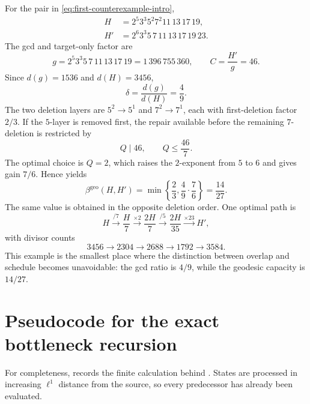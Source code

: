 \documentclass[11pt]{article}
\numberwithin{equation}{section}
\theoremstyle{blueplain}
\theoremstyle{bluedef}
\newcommand{\betageo}{\beta^{\mathrm{geo}}}
\begin{document}
For the pair in \eqref{eq:first-counterexample-intro},
\begin{align*}
 H&=2^5 3^3 5^2 7^2 11\,13\,17\,19,\\
 H'&=2^6 3^3 5\,7\,11\,13\,17\,19\,23.
\end{align*}
The gcd and target-only factor are
\begin{equation}
 g=2^5 3^3 5\,7\,11\,13\,17\,19
   =1\,396\,755\,360,
 \qquad
 C=\frac{H'}g=46.
 \label{eq:first-example-gC}
\end{equation}
Since $d(g)=1536$ and $d(H)=3456$,
\begin{equation}
 \delta=\frac{d(g)}{d(H)}=\frac49.
 \label{eq:first-example-delta}
\end{equation}
The two deletion layers are $5^2\to5^1$ and $7^2\to7^1$, each with first-deletion factor $2/3$.  If the $5$-layer is removed first, the repair available before the remaining $7$-deletion is restricted by
\[
 Q\mid46,
 \qquad
 Q\le\frac{46}{7}.
\]
The optimal choice is $Q=2$, which raises the $2$-exponent from $5$ to $6$ and gives gain $7/6$.  Hence  yields
\begin{equation}
 \betageo(H,H')
 =\min\left\{\frac23,\frac49\cdot\frac76\right\}
 =\frac{14}{27}.
 \label{eq:first-example-capacity}
\end{equation}
The same value is obtained in the opposite deletion order.  One optimal path is
\[
 H\xrightarrow{/7}\frac H7
 \xrightarrow{\times2}\frac{2H}{7}
 \xrightarrow{/5}\frac{2H}{35}
 \xrightarrow{\times23}H',
\]
with divisor counts
\[
 3456\to2304\to2688\to1792\to3584.
\]
This example is the smallest place where the distinction between overlap and schedule becomes unavoidable: the gcd ratio is $4/9$, while the geodesic capacity is $14/27$.

\section{Pseudocode for the exact bottleneck recursion}
\label{app:dp-pseudocode}

For completeness,  records the finite calculation behind .  States are processed in increasing $\ell^1$ distance from the source, so every predecessor has already been evaluated.
\end{document}
